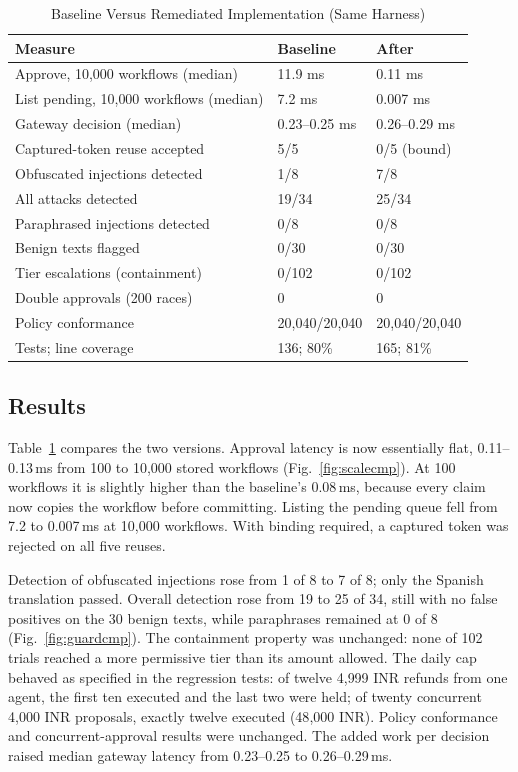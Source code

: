 \documentclass[conference]{IEEEtran}
\begin{document}
\begin{table}[t]
\caption{Baseline Versus Remediated Implementation (Same Harness)}
\label{tab:remediation}
\centering
\begin{tabular}{|l|l|l|}
\hline
\textbf{Measure} & \textbf{Baseline} & \textbf{After} \\
\hline
Approve, 10{,}000 workflows (median) & 11.9 ms & 0.11 ms \\
List pending, 10{,}000 workflows (median) & 7.2 ms & 0.007 ms \\
Gateway decision (median) & 0.23--0.25 ms & 0.26--0.29 ms \\
Captured-token reuse accepted & 5/5 & 0/5 (bound) \\
Obfuscated injections detected & 1/8 & 7/8 \\
All attacks detected & 19/34 & 25/34 \\
Paraphrased injections detected & 0/8 & 0/8 \\
Benign texts flagged & 0/30 & 0/30 \\
Tier escalations (containment) & 0/102 & 0/102 \\
Double approvals (200 races) & 0 & 0 \\
Policy conformance & 20{,}040/20{,}040 & 20{,}040/20{,}040 \\
Tests; line coverage & 136; 80\% & 165; 81\% \\
\hline
\end{tabular}
\end{table}

\subsection{Results}
Table~\ref{tab:remediation} compares the two versions. Approval latency is now essentially flat, 0.11--0.13\,ms from 100 to 10{,}000 stored workflows (Fig.~\ref{fig:scalecmp}). At 100 workflows it is slightly higher than the baseline's 0.08\,ms, because every claim now copies the workflow before committing. Listing the pending queue fell from 7.2 to 0.007\,ms at 10{,}000 workflows. With binding required, a captured token was rejected on all five reuses.

Detection of obfuscated injections rose from 1 of 8 to 7 of 8; only the Spanish translation passed. Overall detection rose from 19 to 25 of 34, still with no false positives on the 30 benign texts, while paraphrases remained at 0 of 8 (Fig.~\ref{fig:guardcmp}). The containment property was unchanged: none of 102 trials reached a more permissive tier than its amount allowed. The daily cap behaved as specified in the regression tests: of twelve 4{,}999 INR refunds from one agent, the first ten executed and the last two were held; of twenty concurrent 4{,}000 INR proposals, exactly twelve executed (48{,}000 INR). Policy conformance and concurrent-approval results were unchanged. The added work per decision raised median gateway latency from 0.23--0.25 to 0.26--0.29\,ms.
\end{document}
